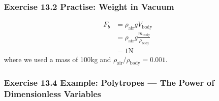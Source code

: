 \documentclass[10pt,a4paper]{book}
\theoremstyle{definition}
\begin{document}
\subsubsection{Exercise 13.2 Practise: Weight in Vacuum}
\begin{align}
    F_{b}&=\rho_\text{air}gV_\text{body}\\
    &=\rho_\text{air}g\frac{m_\text{body}}{\rho_\text{body}}\\
    &=1\text{N}
\end{align}
where we used a mass of 100kg and $\rho_\text{air}/\rho_\text{body}=0.001$.

\subsubsection{Exercise 13.4 Example: Polytropes — The Power of Dimensionless Variables}
\end{document}

